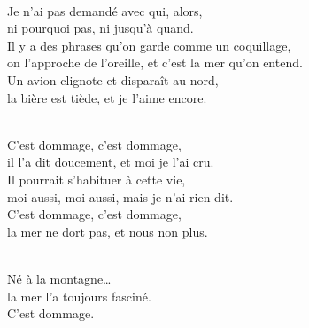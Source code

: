 \begin{lyrics}
\\
Je n'ai pas demandé avec qui, alors,\\
ni pourquoi pas, ni jusqu'à quand.\\
Il y a des phrases qu'on garde comme un coquillage,\\
on l'approche de l'oreille, et c'est la mer qu'on entend.\\
Un avion clignote et disparaît au nord,\\
la bière est tiède, et je l'aime encore.

\\
C'est dommage, c'est dommage,\\
il l'a dit doucement, et moi je l'ai cru.\\
Il pourrait s'habituer à cette vie,\\
moi aussi, moi aussi, mais je n'ai rien dit.\\
C'est dommage, c'est dommage,\\
la mer ne dort pas, et nous non plus.

\\
Né à la montagne…\\
la mer l'a toujours fasciné.\\
C'est dommage.
\end{lyrics}

